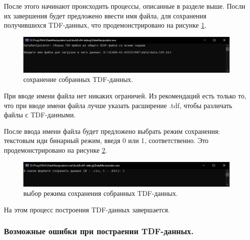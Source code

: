 {  \par После этого начинают происходить процессы, описанные в разделе выше. Посли их завершения будет предложено ввести имя файла, для сохранения получившихся TDF-данных, что продемонстрировано на рисунке \ref{fig:CreateTDFSR}.

  \begin{figure}[H]
    \centering
    \includegraphics[width=\textwidth]{images/forDataManipulator/CreateTDFSafeResult.png}
    \caption{сохранение собранных TDF-данных.} 
    \label{fig:CreateTDFSR}
  \end{figure}

  \par При вводе имени файла нет никаких ограничей. Из рекомендаций есть только то, что при вводе имени файла лучше указать расширение .tdf, чтобы различать файлы с TDF-данными.
  
  \par После ввода имени файла будет предложено выбрать режим сохранения: текстовым иди бинарный режим, введя 0 или 1, соответственно. Это продемонстрировано на рисунке \ref{fig:CreateTDFTS}. 

  \begin{figure}[H]
    \centering
    \includegraphics[width=\textwidth]{images/forDataManipulator/CreateTDFTypeSafe.png}
    \caption{выбор режима сохранения собранных TDF-данных.} 
    \label{fig:CreateTDFTS}
  \end{figure}

  \par На этом процесс построения TDF-данных завершается.

  \par 

}

\subsubsection{ \standartTitleFont
  Возможные ошибки при постраении TDF-данных.
} \label{subsubsec:CreateTDFErr}

